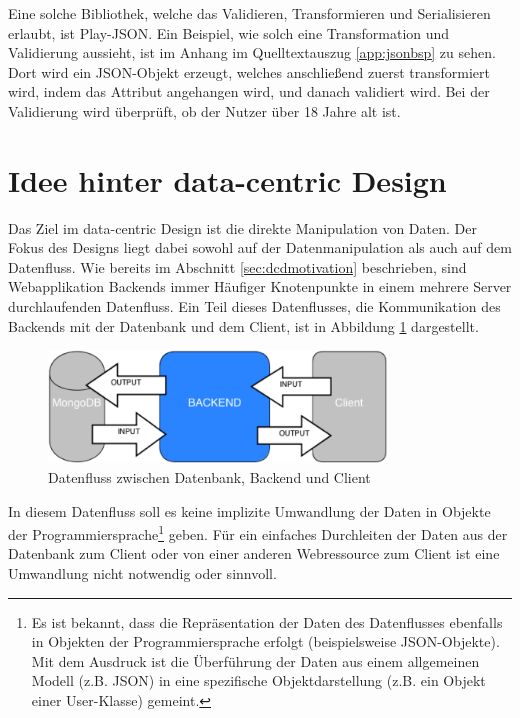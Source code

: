 Eine solche Bibliothek, welche das Validieren, Transformieren und Serialisieren erlaubt, ist Play-JSON. Ein Beispiel, wie solch eine Transformation und Validierung aussieht, ist im Anhang im Quelltextauszug \ref{app:jsonbsp} zu sehen. Dort wird ein JSON-Objekt erzeugt, welches anschließend zuerst transformiert wird, indem das Attribut  angehangen wird, und danach validiert wird. Bei der Validierung wird überprüft, ob der Nutzer über 18 Jahre alt ist.

\section{Idee hinter data-centric Design}
Das Ziel im data-centric Design ist die direkte Manipulation von Daten. Der Fokus des Designs liegt dabei sowohl auf der Datenmanipulation als auch auf dem Datenfluss. Wie bereits im Abschnitt \ref{sec:dcdmotivation} beschrieben, sind Webapplikation Backends immer Häufiger Knotenpunkte in einem mehrere Server durchlaufenden Datenfluss. Ein Teil dieses Datenflusses, die Kommunikation des Backends mit der Datenbank und dem Client, ist in Abbildung \ref{fig:dataflow} dargestellt. 

\begin{figure}[h]   
  \centering     
  \includegraphics[width=0.8\textwidth]{img/dataflow.png}  
   \caption{Datenfluss zwischen Datenbank, Backend und Client}   
  \label{fig:dataflow} 
\end{figure}

In diesem Datenfluss soll es keine implizite Umwandlung der Daten in Objekte der Programmiersprache\footnote{Es ist bekannt, dass die Repräsentation der Daten des Datenflusses ebenfalls in Objekten der Programmiersprache erfolgt (beispielsweise JSON-Objekte). Mit dem Ausdruck ist die Überführung der Daten aus einem allgemeinen Modell (z.B. JSON) in eine spezifische Objektdarstellung (z.B. ein Objekt einer User-Klasse) gemeint.} geben. Für ein einfaches Durchleiten der Daten aus der Datenbank zum Client oder von einer anderen Webressource zum Client ist eine Umwandlung nicht notwendig oder sinnvoll. 

